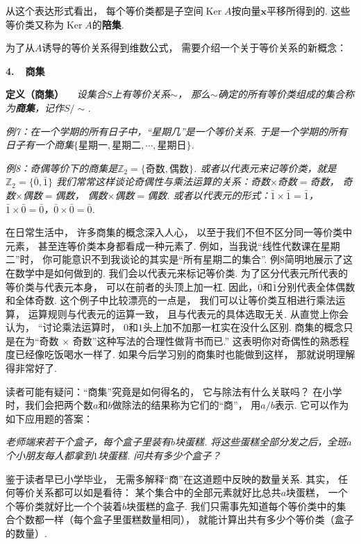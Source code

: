 从这个表达形式看出，
每个等价类都是子空间$\operatorname{Ker}A$按向量$\bm{x}$平移所得到的.
这些等价类又称为$\operatorname{Ker}A$的\textbf{陪集}.


为了从$A$诱导的等价关系得到维数公式，
需要介绍一个关于等价关系的新概念：

\clearpage

\textbf{4.~~商集}

\textbf{定义（商集）}~~
\textit{设集合$S$上有等价关系$\sim$，
那么$\sim$确定的所有等价类组成的集合称为\textbf{商集}，记作$S / \sim$.}

\textit{例7：在一个学期的所有日子中，“星期几”是一个等价关系.
于是一个学期的所有日子有一个商集$\{ \text{星期一},\text{星期二}, \cdots , \text{星期日} \}$.}

\textit{例8：奇偶等价下的商集是$\mathbb{Z}_2 = \{ \text{奇数}, \text{偶数} \}$.
或者以代表元来记等价类，就是$\mathbb{Z}_2 = \{ \bar{0},\bar{1} \}$
我们常常这样谈论奇偶性与乘法运算的关系：奇数$\times$奇数$=$奇数，
奇数$\times$偶数$=$偶数，
偶数$\times$偶数$=$偶数.
或者以代表元的形式：$\bar{1} \times \bar{1} = \bar{1}$，$\bar{1} \times \bar{0} = \bar{0}$，$\bar{0} \times \bar{0} = \bar{0}$.
}\medskip

在日常生活中，
许多商集的概念深入人心，
以至于我们不但不区分同一等价类中元素，
甚至连等价类本身都看成一种元素了.
例如，当我说“线性代数课在星期二”时，
你可能意识不到我谈论的其实是“所有星期二的集合”.
例8简明地展示了这在数学中是如何做到的.
我们会以代表元来标记等价类.
为了区分代表元所代表的等价类与代表元本身，
可以在前者的头顶上加一杠.
因此，$\bar{0}$和$\bar{1}$分别代表全体偶数和全体奇数.
这个例子中比较漂亮的一点是，
我们可以让等价类互相进行乘法运算，
运算规则与代表元的运算一致，
且与代表元的具体选取无关.
从直觉上你会认为，
“讨论乘法运算时，
$0$和$1$头上加不加那一杠实在没什么区别.
商集的概念只是在为“奇数 $\times$ 奇数”这种写法的合理性做背书而已.”
这表明你对奇偶性的熟悉程度已经像吃饭喝水一样了.
如果今后学习别的商集时也能做到这样，
那就说明理解得非常好了.

读者可能有疑问：“商集”究竟是如何得名的，
它与除法有什么关联吗？
在小学时，我们会把两个数$a$和$b$做除法的结果称为它们的“商”，
用$a / b$表示.
它可以作为如下应用题的答案：\medskip

\textit{老师端来若干个盒子，每个盒子里装有$b$块蛋糕. 
将这些蛋糕全部分发之后，全班$a$个小朋友每人都拿到$1$块蛋糕.
问共有多少个盒子？}
\medskip

鉴于读者早已小学毕业，
无需多解释“商”在这道题中反映的数量关系.
其实，
任何等价关系都可以如是看待：
某个集合中的全部元素就好比总共$a$块蛋糕，
一个个等价类就好比一个个装着$b$块蛋糕的盒子.
我们只需事先知道每个等价类中的集合个数都一样（每个盒子里蛋糕数量相同），
就能计算出共有多少个等价类（盒子的数量）.
\medskip

